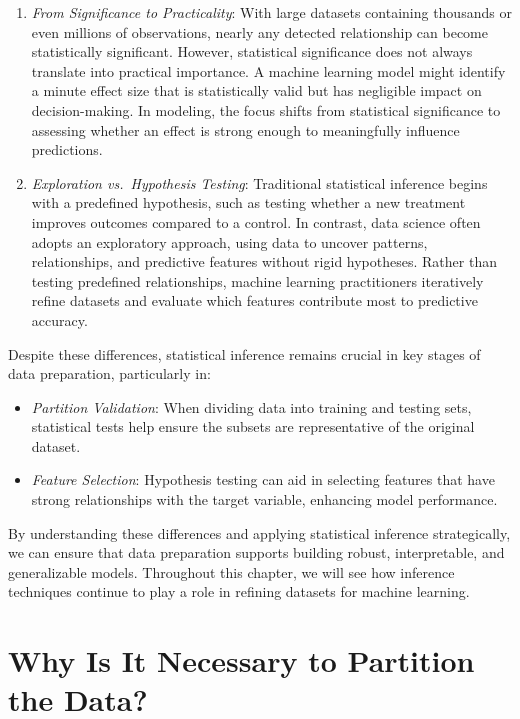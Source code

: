 \documentclass[
  11pt,
]{book}
\providecommand{\tightlist}{%
  \setlength{\itemsep}{0pt}\setlength{\parskip}{0pt}}
\theoremstyle{definition}
\theoremstyle{definition}
\theoremstyle{definition}
\theoremstyle{definition}
\theoremstyle{remark}
\begin{document}
\begin{enumerate}
\def\labelenumi{\arabic{enumi}.}
\item
  \emph{From Significance to Practicality}: With large datasets containing thousands or even millions of observations, nearly any detected relationship can become statistically significant. However, statistical significance does not always translate into practical importance. A machine learning model might identify a minute effect size that is statistically valid but has negligible impact on decision-making. In modeling, the focus shifts from statistical significance to assessing whether an effect is strong enough to meaningfully influence predictions.
\item
  \emph{Exploration vs.~Hypothesis Testing}: Traditional statistical inference begins with a predefined hypothesis, such as testing whether a new treatment improves outcomes compared to a control. In contrast, data science often adopts an exploratory approach, using data to uncover patterns, relationships, and predictive features without rigid hypotheses. Rather than testing predefined relationships, machine learning practitioners iteratively refine datasets and evaluate which features contribute most to predictive accuracy.
\end{enumerate}

Despite these differences, statistical inference remains crucial in key stages of data preparation, particularly in:

\begin{itemize}
\tightlist
\item
  \emph{Partition Validation}: When dividing data into training and testing sets, statistical tests help ensure the subsets are representative of the original dataset.
\item
  \emph{Feature Selection}: Hypothesis testing can aid in selecting features that have strong relationships with the target variable, enhancing model performance.
\end{itemize}

By understanding these differences and applying statistical inference strategically, we can ensure that data preparation supports building robust, interpretable, and generalizable models. Throughout this chapter, we will see how inference techniques continue to play a role in refining datasets for machine learning.

\section{Why Is It Necessary to Partition the Data?}\label{why-is-it-necessary-to-partition-the-data}
\end{document}
